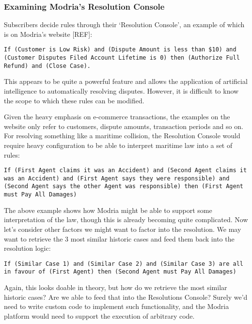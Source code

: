 \subsubsection{Examining Modria's Resolution Console}

Subscribers decide rules through their `Resolution Console', an example of which is on Modria's website [REF]:

\begin{lstlisting}
If (Customer is Low Risk) and (Dispute Amount is less than $10) and (Customer Disputes Filed Account Lifetime is 0) then (Authorize Full Refund) and (Close Case).
\end{lstlisting}

This appears to be quite a powerful feature and allows the application of artificial intelligence to automatically resolving disputes. However, it is difficult to know the scope to which these rules can be modified.

Given the heavy emphasis on e-commerce transactions, the examples on the website only refer to customers, dispute amounts, transaction periods and so on. For resolving something like a maritime collision, the Resolution Console would require heavy configuration to be able to interpret maritime law into a set of rules:

\begin{lstlisting}
If (First Agent claims it was an Accident) and (Second Agent claims it was an Accident) and (First Agent says they were responsible) and (Second Agent says the other Agent was responsible) then (First Agent must Pay All Damages)
\end{lstlisting}

The above example shows how Modria might be able to support some interpretation of the law, though this is already becoming quite complicated. Now let's consider other factors we might want to factor into the resolution. We may want to retrieve the 3 most similar historic cases and feed them back into the resolution logic:

\begin{lstlisting}
If (Similar Case 1) and (Similar Case 2) and (Similar Case 3) are all in favour of (First Agent) then (Second Agent must Pay All Damages)
\end{lstlisting}

Again, this looks doable in theory, but how do we retrieve the most similar historic cases? Are we able to feed that into the Resolutions Console? Surely we'd need to write custom code to implement such functionality, and the Modria platform would need to support the execution of arbitrary code.

